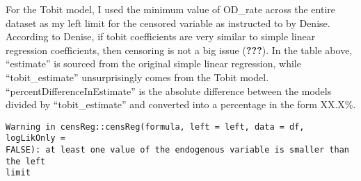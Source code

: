 \documentclass[12pt,twoside]{reedthesis}
\newenvironment{Shaded}{\begin{snugshade}}{\end{snugshade}}
\newcommand{\CommentTok}[1]{\textcolor[rgb]{0.56,0.35,0.01}{\textit{#1}}}
\newcommand{\ControlFlowTok}[1]{\textcolor[rgb]{0.13,0.29,0.53}{\textbf{#1}}}
\newcommand{\DataTypeTok}[1]{\textcolor[rgb]{0.13,0.29,0.53}{#1}}
\newcommand{\FloatTok}[1]{\textcolor[rgb]{0.00,0.00,0.81}{#1}}
\newcommand{\KeywordTok}[1]{\textcolor[rgb]{0.13,0.29,0.53}{\textbf{#1}}}
\newcommand{\NormalTok}[1]{#1}
\newcommand{\OperatorTok}[1]{\textcolor[rgb]{0.81,0.36,0.00}{\textbf{#1}}}
\newcommand{\OtherTok}[1]{\textcolor[rgb]{0.56,0.35,0.01}{#1}}
\newcommand{\StringTok}[1]{\textcolor[rgb]{0.31,0.60,0.02}{#1}}
\begin{document}
For the Tobit model, I used the minimum value of OD\_rate across the entire dataset as my left limit for the censored variable as instructed to by Denise. According to Denise, if tobit coefficients are very similar to simple linear regression coefficients, then censoring is not a big issue ({\textbf{???}}). In the table above, ``estimate'' is sourced from the original simple linear regression, while ``tobit\_estimate'' unsurprisingly comes from the Tobit model. ``percentDifferenceInEstimate'' is the absolute difference between the models divided by ``tobit\_estimate'' and converted into a percentage in the form XX.X\%.
\begin{Shaded}
\end{Shaded}
\begin{Shaded}
\end{Shaded}
\begin{verbatim}
Warning in censReg::censReg(formula, left = left, data = df, logLikOnly =
FALSE): at least one value of the endogenous variable is smaller than the left
limit
\end{verbatim}
\end{document}
